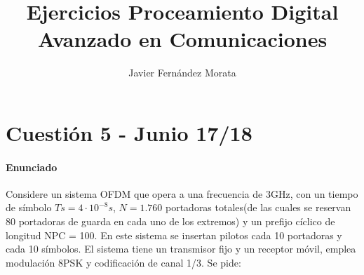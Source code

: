 \documentclass[fleqn,14pt]{article}
\title{Ejercicios Proceamiento Digital Avanzado en Comunicaciones}
\author{Javier Fern\'andez Morata}
\begin{document}
\maketitle
{}

\section*{Cuesti\'on 5 \-- Junio 17/18 }
\paragraph{Enunciado}
Considere un sistema OFDM que opera a una frecuencia de 3GHz, con un tiempo de símbolo $Ts = 4\cdot10^{-8} s$, $N = 1.760$ portadoras totales(de las cuales se reservan 80 portadoras de guarda en cada uno de los extremos) y un prefijo cíclico de longitud NPC = 100. En este sistema se insertan pilotos cada 10 portadoras y cada 10 símbolos. El sistema tiene un transmisor fijo y un receptor móvil, emplea modulación 8PSK y codificación de canal 1/3. Se pide:
\end{document}
